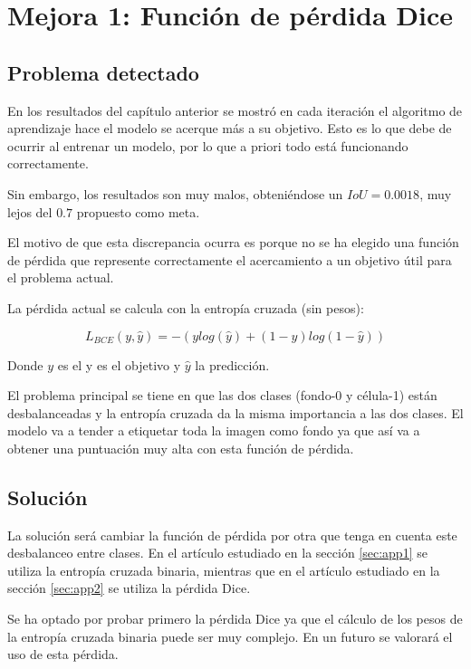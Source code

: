 \chapter{Mejora 1: Función de pérdida Dice}\label{loss_function}

\section{Problema detectado}\label{sec:loss_function_problem}

En los resultados del capítulo anterior se mostró en cada iteración el algoritmo de aprendizaje hace el modelo se acerque más a su objetivo. Esto es lo que debe de ocurrir al entrenar un modelo, por lo que a priori todo está funcionando correctamente.

Sin embargo, los resultados son muy malos, obteniéndose un $IoU=0.0018$, muy lejos del $0.7$ propuesto como meta.

El motivo de que esta discrepancia ocurra es porque no se ha elegido una función de pérdida que represente correctamente el acercamiento a un objetivo útil para el problema actual.

La pérdida actual se calcula con la entropía cruzada (sin pesos):

\begin{equation}
L_{BCE}(y,\hat{y})=-(y log(\hat{y}) + (1-y)log(1-\hat{y}))
\end{equation}

Donde $y$ es el y es el objetivo y $\hat{y}$ la predicción.

El problema principal se tiene en que las dos clases (fondo-0 y célula-1) están desbalanceadas y la entropía cruzada da la misma importancia a las dos clases. El modelo va a tender a etiquetar toda la imagen como fondo ya que así va a obtener una puntuación muy alta con esta función de pérdida.

\section{Solución}\label{sec:loss_function_change}

La solución será cambiar la función de pérdida por otra que tenga en cuenta este desbalanceo entre clases. En el artículo estudiado en la sección \ref{sec:app1} se utiliza la entropía cruzada binaria, mientras que en el artículo estudiado en la sección \ref{sec:app2} se utiliza la pérdida Dice.

Se ha optado por probar primero la pérdida Dice ya que el cálculo de los pesos de la entropía cruzada binaria puede ser muy complejo. En un futuro se valorará el uso de esta pérdida.


